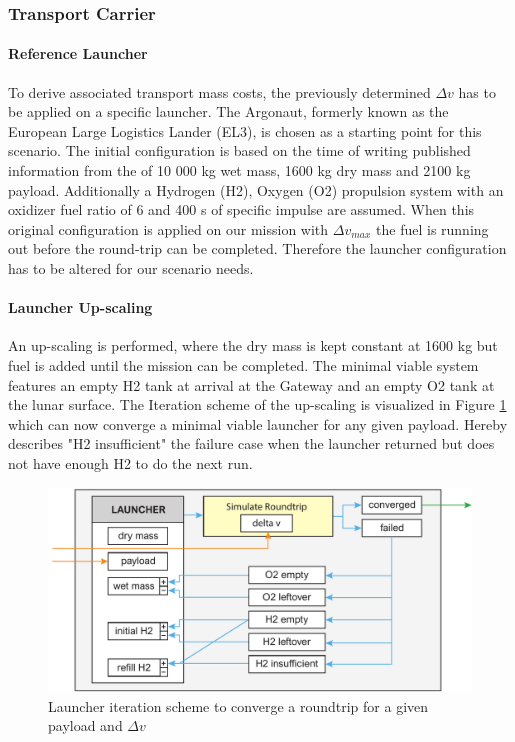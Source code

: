 \documentclass[utf8]{FrontiersinHarvard} %
\begin{document}
\subsubsection{Transport Carrier}
\label{sec:carrier}
\paragraph{Reference Launcher}
To derive associated transport mass costs, the previously determined $\Delta v$ has to be applied on a specific launcher.
The Argonaut, formerly known as the European Large Logistics Lander (EL3), is chosen as a starting point for this scenario.
The initial configuration is based on the time of writing published information from the \cite{ESA_2023} of 10 000 kg wet mass, 1600 kg dry mass and 2100 kg payload.
Additionally a Hydrogen (H2), Oxygen (O2) propulsion system with an oxidizer fuel ratio of 6 and 400 s of specific impulse are assumed.
When this original configuration is applied on our mission with $\Delta v_{max}$ the fuel is running out before the round-trip can be completed.
Therefore the launcher configuration has to be altered for our scenario needs.

\paragraph{Launcher Up-scaling}
An up-scaling is performed, where the dry mass is kept constant at 1600 kg but fuel is added until the mission can be completed.
The minimal viable system features an empty H2 tank at arrival at the Gateway and an empty O2 tank at the lunar surface.
The Iteration scheme of the up-scaling is visualized in Figure \ref{fig:upscale_iteration} which can now converge a minimal viable launcher for any given payload.
Hereby describes "H2 insufficient" the failure case when the launcher returned but does not have enough H2 to do the next run.

\begin{figure}[h!]
\begin{center}
\includegraphics[width=\linewidth]{img/launcher_iteration.pdf}
\end{center}
\caption{Launcher iteration scheme to converge a roundtrip for a given payload and $\Delta v$}
\label{fig:upscale_iteration}
\end{figure}
\end{document}
